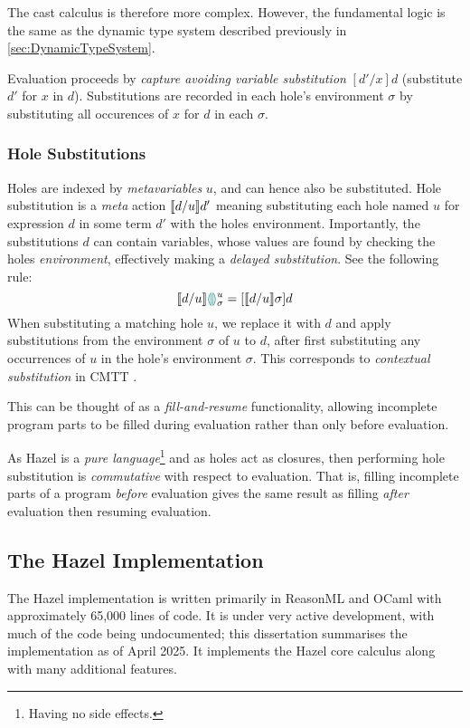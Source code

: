 The cast calculus is therefore more complex. However, the fundamental logic is the same as the dynamic type system described previously in \cref{sec:DynamicTypeSystem}.


Evaluation proceeds by \textit{capture avoiding variable substitution} $[d'/x]d$ (substitute $d'$ for $x$ in $d$). Substitutions are recorded in each hole's environment $\sigma$ by substituting all occurences of $x$ for $d$ in each $\sigma$. 

\subsubsection{Hole Substitutions}\label{sec:HoleSubstitution}
Holes are indexed by \textit{metavariables} $u$, and can hence also be substituted. Hole substitution is a \textit{meta} action $\llbracket d/u \rrbracket d'$ meaning substituting each hole named $u$ for expression $d$ in some term $d'$ with the holes environment. Importantly, the substitutions $d$ can contain variables, whose values are found by checking the holes \textit{environment}, effectively making a \textit{delayed substitution}. See the following rule:
 \[\llbracket d/u \rrbracket {\color{teal}\llparenthesis}  {\color{teal}\rrparenthesis}^u_\sigma = [\llbracket d/u \rrbracket \sigma]d\]
When substituting a matching hole $u$, we replace it with $d$ and apply substitutions from the environment $\sigma$ of $u$ to $d$, after first substituting any occurrences of $u$ in the hole's environment $\sigma$. This corresponds to \textit{contextual substitution} in CMTT \cite{CMTT}.
 
 This can be thought of as a \textit{fill-and-resume} functionality, allowing incomplete program parts to be filled during evaluation rather than only before evaluation.

As Hazel is a \textit{pure language}\footnote{Having no side effects.} and as holes act as closures, then performing hole substitution is \textit{commutative} with respect to evaluation. That is, filling incomplete parts of a program \textit{before} evaluation gives the same result as filling \textit{after} evaluation then resuming evaluation.

\subsection{The Hazel Implementation}\label{sec:HazelImplementation}
The Hazel implementation \cite{HazelCode} is written primarily in ReasonML and OCaml with approximately 65,000 lines of code. It is under very active development, with much of the code being undocumented; this dissertation summarises the implementation as of April 2025. It implements the Hazel core calculus along with many additional features. 


